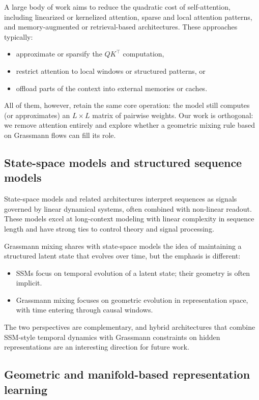 \documentclass[11pt]{article}
\begin{document}
A large body of work aims to reduce the quadratic cost of self-attention, including linearized or kernelized attention, sparse and local attention patterns, and memory-augmented or retrieval-based architectures. These approaches typically:

\begin{itemize}
    \item approximate or sparsify the $QK^\top$ computation,
    \item restrict attention to local windows or structured patterns, or
    \item offload parts of the context into external memories or caches.
\end{itemize}

All of them, however, retain the same core operation: the model still computes (or approximates) an $L \times L$ matrix of pairwise weights. Our work is orthogonal: we remove attention entirely and explore whether a geometric mixing rule based on Grassmann flows can fill its role.

\subsection{State-space models and structured sequence models}

State-space models and related architectures interpret sequences as signals governed by linear dynamical systems, often combined with non-linear readout. These models excel at long-context modeling with linear complexity in sequence length and have strong ties to control theory and signal processing.

Grassmann mixing shares with state-space models the idea of maintaining a structured latent state that evolves over time, but the emphasis is different:

\begin{itemize}
    \item SSMs focus on temporal evolution of a latent state; their geometry is often implicit.
    \item Grassmann mixing focuses on geometric evolution in representation space, with time entering through causal windows.
\end{itemize}

The two perspectives are complementary, and hybrid architectures that combine SSM-style temporal dynamics with Grassmann constraints on hidden representations are an interesting direction for future work.

\subsection{Geometric and manifold-based representation learning}
\end{document}
